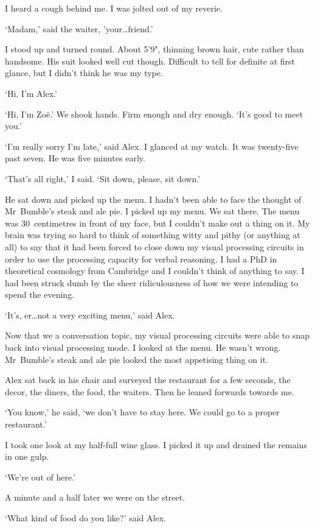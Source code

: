 I heard a cough behind me. I was jolted out of my reverie.

`Madam,' said the waiter, 'your\dots {\twelveit friend}.'

I stood up and turned round. About 5'9", thinning brown hair, cute
rather than handsome. His suit looked well cut though. Difficult to tell for definite at first glance, but I didn't think he was my type.

`Hi, I'm Alex.'

`Hi, I'm Zo{\"e}.' We shook hands. Firm enough and dry enough. `It's good to meet you.'

`I'm really sorry I'm late,' said Alex. I glanced at my watch. It was
twenty-five past seven. He was five minutes early.

`That's all right,' I said. `Sit down, please, sit down.'

He sat down and picked up the menu. I hadn't been able to face the thought of Mr~Bumble's steak
and ale pie. I picked up my menu. We sat there. The menu was 30~centimetres in front
of my face, but I couldn't make out a thing on it. My brain
was trying so hard to think of something witty and pithy (or anything at all) to say that it had been
forced to close down my visual processing circuits in order to use
the processing capacity for verbal reasoning. I had a PhD in theoretical cosmology from Cambridge
and I couldn't think of anything to say. I had been struck dumb by the sheer ridiculousness of how we were intending to spend the evening.

`It's, er\dots not a very exciting menu,' said Alex.

Now that we a conversation topic, my visual processing circuits
were able to snap back into visual processing mode. I looked at the menu. He
wasn't wrong. Mr~Bumble's steak and ale pie looked the most
appetising thing on it.

Alex sat back in his chair and surveyed the restaurant for a few
seconds, the decor, the diners, the food, the waiters. Then he
leaned forwards towards me.

`You know,' he said, `we don't have to stay here. We could go to a
proper restaurant.'

I took one look at my half-full wine glass. I picked it up and
drained the remains in one gulp.

`We're out of here.'

A minute and a half later we were on the street.

`What kind of food do you like?' said Alex.

